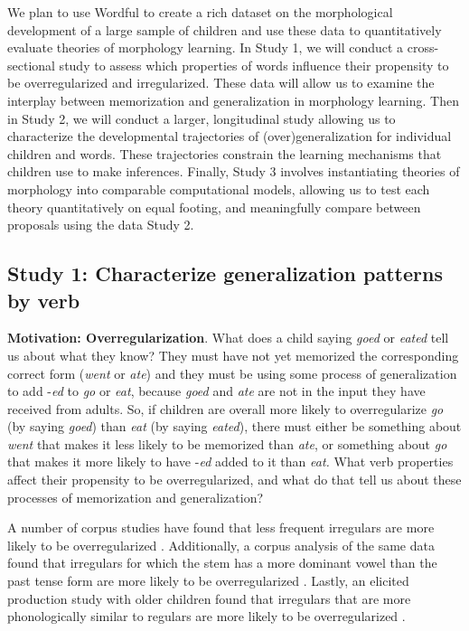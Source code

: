 \documentclass[
   11pt,
       ]{book}
\begin{document}
We plan to use Wordful to create a rich dataset on the morphological development of a large sample of children and use these data to quantitatively evaluate theories of morphology learning. In Study 1, we will conduct a cross-sectional study to assess which properties of words influence their propensity to be overregularized and irregularized. These data will allow us to examine the interplay between memorization and generalization in morphology learning. Then in Study 2, we will conduct a larger, longitudinal study allowing us to characterize the developmental trajectories of (over)generalization for individual children and words. These trajectories constrain the learning mechanisms that children use to make inferences. Finally, Study 3 involves instantiating theories of morphology into comparable computational models, allowing us to test each theory quantitatively on equal footing, and meaningfully compare between proposals using the data Study 2.

\hypertarget{study-1-characterize-generalization-patterns-by-verb}{%
\subsection{Study 1: Characterize generalization patterns by verb}\label{study-1-characterize-generalization-patterns-by-verb}}

\textbf{Motivation: Overregularization}. What does a child saying \emph{goed} or \emph{eated} tell us about what they know? They must have not yet memorized the corresponding correct form (\emph{went} or \emph{ate}) and they must be using some process of generalization to add -\emph{ed} to \emph{go} or \emph{eat}, because \emph{goed} and \emph{ate} are not in the input they have received from adults. So, if children are overall more likely to overregularize \emph{go} (by saying \emph{goed}) than \emph{eat} (by saying \emph{eated}), there must either be something about \emph{went} that makes it less likely to be memorized than \emph{ate}, or something about \emph{go} that makes it more likely to have -\emph{ed} added to it than \emph{eat.} What verb properties affect their propensity to be overregularized, and what do that tell us about these processes of memorization and generalization?

A number of corpus studies have found that less frequent irregulars are more likely to be overregularized \citep{maratsos2000, marcus1992, maslen2004}. Additionally, a corpus analysis of the same data found that irregulars for which the stem has a more dominant vowel than the past tense form are more likely to be overregularized \citep{stemberger1993}. Lastly, an elicited production study with older children found that irregulars that are more phonologically similar to regulars are more likely to be overregularized \citep{marchman1997productivity}.
\end{document}

